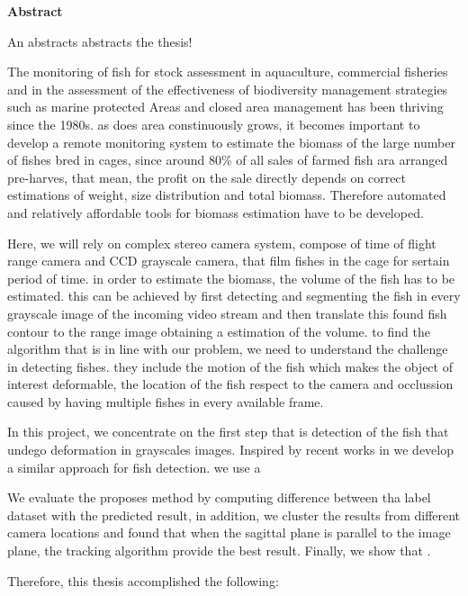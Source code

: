 

\clearemptydoublepage
{}
{}	





\vspace*{2cm}
\begin{center}
{\Large \bf Abstract}
\end{center}
\vspace{1cm}

An abstracts abstracts the thesis!

The monitoring of fish for stock assessment in aquaculture, commercial fisheries and in the assessment of the effectiveness of biodiversity management strategies such as marine protected Areas and closed area management has been thriving since the 1980s.
as does area constinuously grows, 
it becomes important to develop a remote monitoring system to estimate the biomass of the large number of fishes bred in cages,
since around 80\% of all sales of farmed fish ara arranged pre-harves,
that mean, the profit on the sale directly depends on correct estimations of weight,
size distribution and total biomass.
Therefore automated and relatively affordable tools for biomass estimation have to be developed.

Here, we will rely on complex stereo camera system,
compose of time of flight range camera and CCD grayscale camera,
that film fishes in the cage for sertain period of time.
in order to estimate the biomass, the volume of the fish has to be estimated. this can be achieved by first detecting and segmenting the fish in every grayscale image of the incoming video stream and then translate this found fish contour  to the range image obtaining a estimation of the volume.
to find the algorithm that is in line with our problem,
we need to understand the challenge in detecting fishes.
they include the motion of the fish which makes the object of interest deformable,
the location of the fish respect to the camera and occlussion caused by having multiple fishes in every available frame.

In this project, we concentrate on the first step that is detection of the fish that undego deformation in grayscales images.
Inspired by recent works in  
we develop a similar approach for fish detection. we use a 

We evaluate the proposes method by computing difference between tha label dataset with the predicted result,
in addition, we cluster the results from different camera locations and found that when the sagittal plane is parallel to the image plane,
the tracking algorithm provide the best result.
Finally, we show that .

Therefore, this thesis accomplished the following:
